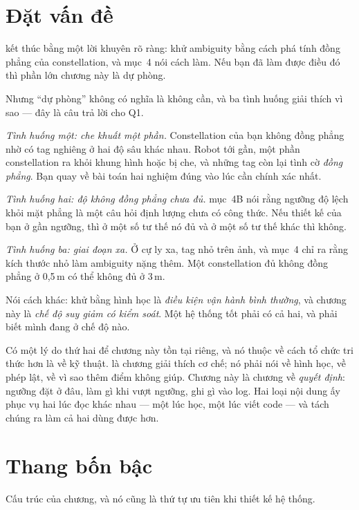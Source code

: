 \documentclass[../../marker.tex]{subfiles}
\begin{document}
\section{Đặt vấn đề}

 kết thúc bằng một lời khuyên rõ ràng: khử ambiguity bằng cách phá tính đồng phẳng của constellation, và  mục~4 nói cách làm. Nếu bạn đã làm được điều đó thì phần lớn chương này là dự phòng.

Nhưng ``dự phòng'' không có nghĩa là không cần, và ba tình huống giải thích vì sao --- đây là câu trả lời cho Q1.

\emph{Tình huống một: che khuất một phần.} Constellation của bạn không đồng phẳng nhờ có tag nghiêng ở hai độ sâu khác nhau. Robot tới gần, một phần constellation ra khỏi khung hình hoặc bị che, và những tag còn lại tình cờ \emph{đồng phẳng}. Bạn quay về bài toán hai nghiệm đúng vào lúc cần chính xác nhất.

\emph{Tình huống hai: độ không đồng phẳng chưa đủ.}  mục~4B nói rằng ngưỡng độ lệch khỏi mặt phẳng là một câu hỏi định lượng chưa có công thức. Nếu thiết kế của bạn ở gần ngưỡng, thì ở một số tư thế nó đủ và ở một số tư thế khác thì không.

\emph{Tình huống ba: giai đoạn xa.} Ở cự ly xa, tag nhỏ trên ảnh, và  mục~4 chỉ ra rằng kích thước nhỏ làm ambiguity nặng thêm. Một constellation đủ không đồng phẳng ở 0,5\,m có thể không đủ ở 3\,m.

Nói cách khác: khử bằng hình học là \emph{điều kiện vận hành bình thường}, và chương này là \emph{chế độ suy giảm có kiểm soát}. Một hệ thống tốt phải có cả hai, và phải biết mình đang ở chế độ nào.

Có một lý do thứ hai để chương này tồn tại riêng, và nó thuộc về cách tổ chức tri thức hơn là về kỹ thuật.  là chương giải thích cơ chế; nó phải nói về hình học, về phép lật, về vì sao thêm điểm không giúp. Chương này là chương về \emph{quyết định}: ngưỡng đặt ở đâu, làm gì khi vượt ngưỡng, ghi gì vào log. Hai loại nội dung ấy phục vụ hai lúc đọc khác nhau --- một lúc học, một lúc viết code --- và tách chúng ra làm cả hai dùng được hơn.

\section{Thang bốn bậc}

Cấu trúc của chương, và nó cũng là thứ tự ưu tiên khi thiết kế hệ thống.
\end{document}
